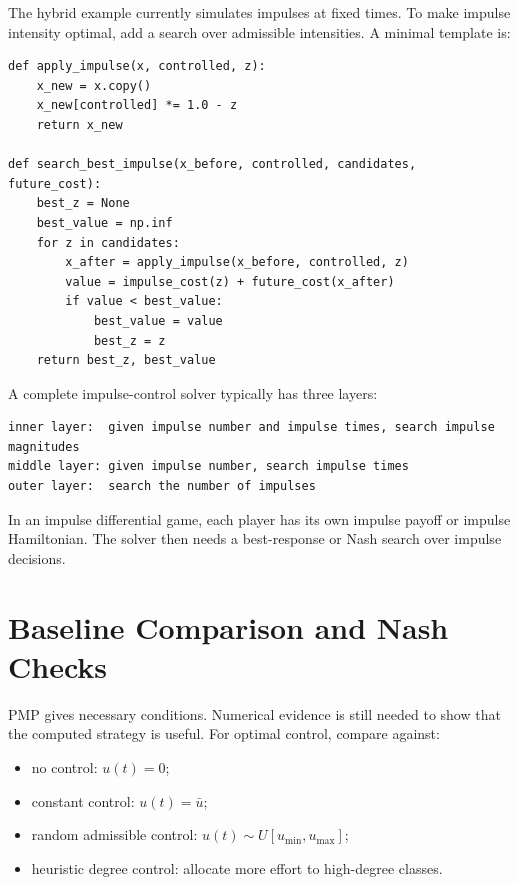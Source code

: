 \documentclass[11pt,a4paper]{article}
\begin{document}
The hybrid example currently simulates impulses at fixed times. To make impulse intensity optimal, add a search over admissible intensities. A minimal template is:

\begin{lstlisting}[style=py]
def apply_impulse(x, controlled, z):
    x_new = x.copy()
    x_new[controlled] *= 1.0 - z
    return x_new

def search_best_impulse(x_before, controlled, candidates, future_cost):
    best_z = None
    best_value = np.inf
    for z in candidates:
        x_after = apply_impulse(x_before, controlled, z)
        value = impulse_cost(z) + future_cost(x_after)
        if value < best_value:
            best_value = value
            best_z = z
    return best_z, best_value
\end{lstlisting}

A complete impulse-control solver typically has three layers:

\begin{lstlisting}[style=text]
inner layer:  given impulse number and impulse times, search impulse magnitudes
middle layer: given impulse number, search impulse times
outer layer:  search the number of impulses
\end{lstlisting}

In an impulse differential game, each player has its own impulse payoff or impulse Hamiltonian. The solver then needs a best-response or Nash search over impulse decisions.

\section{Baseline Comparison and Nash Checks}

PMP gives necessary conditions. Numerical evidence is still needed to show that the computed strategy is useful. For optimal control, compare against:

\begin{itemize}
  \item no control: \(u(t)=0\);
  \item constant control: \(u(t)=\bar u\);
  \item random admissible control: \(u(t)\sim U[u_{\min},u_{\max}]\);
  \item heuristic degree control: allocate more effort to high-degree classes.
\end{itemize}
\end{document}
